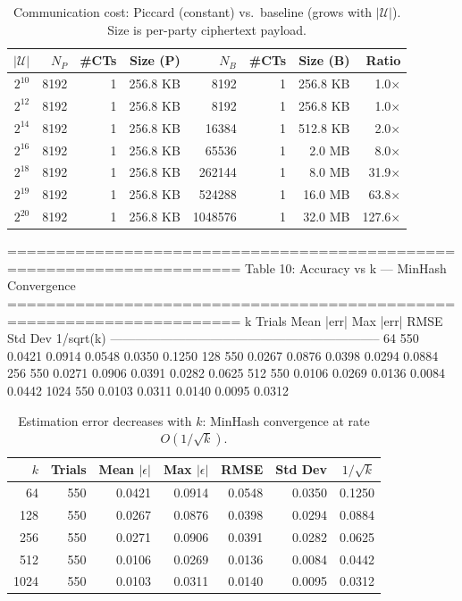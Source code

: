 \begin{table}[t]
\centering
\caption{Communication cost: Piccard (constant) vs.\ baseline (grows with $|\mathcal{U}|$). Size is per-party ciphertext payload.}
\label{tab:communication-cost}
\begin{tabular}{rrrrrrrr}
\toprule
$|\mathcal{U}|$ & $N_P$ & \#CTs & Size (P) & $N_B$ & \#CTs & Size (B) & Ratio \\
\midrule
$2^{10}$ & 8192 & 1 & 256.8 KB & 8192 & 1 & 256.8 KB & 1.0$\times$ \\
$2^{12}$ & 8192 & 1 & 256.8 KB & 8192 & 1 & 256.8 KB & 1.0$\times$ \\
$2^{14}$ & 8192 & 1 & 256.8 KB & 16384 & 1 & 512.8 KB & 2.0$\times$ \\
$2^{16}$ & 8192 & 1 & 256.8 KB & 65536 & 1 & 2.0 MB & 8.0$\times$ \\
$2^{18}$ & 8192 & 1 & 256.8 KB & 262144 & 1 & 8.0 MB & 31.9$\times$ \\
$2^{19}$ & 8192 & 1 & 256.8 KB & 524288 & 1 & 16.0 MB & 63.8$\times$ \\
$2^{20}$ & 8192 & 1 & 256.8 KB & 1048576 & 1 & 32.0 MB & 127.6$\times$ \\
\bottomrule
\end{tabular}
\end{table}


======================================================================
  Table 10: Accuracy vs k — MinHash Convergence
======================================================================
     k  Trials  Mean |err|  Max |err|    RMSE  Std Dev  1/sqrt(k)
-----------------------------------------------------------------
    64     550      0.0421     0.0914  0.0548   0.0350     0.1250
   128     550      0.0267     0.0876  0.0398   0.0294     0.0884
   256     550      0.0271     0.0906  0.0391   0.0282     0.0625
   512     550      0.0106     0.0269  0.0136   0.0084     0.0442
  1024     550      0.0103     0.0311  0.0140   0.0095     0.0312

\begin{table}[t]
\centering
\caption{Estimation error decreases with $k$: MinHash convergence at rate $O(1/\sqrt{k})$.}
\label{tab:accuracy-vs-k}
\begin{tabular}{rrrrrrr}
\toprule
$k$ & Trials & Mean $|\epsilon|$ & Max $|\epsilon|$ & RMSE & Std Dev & $1/\sqrt{k}$ \\
\midrule
64 & 550 & 0.0421 & 0.0914 & 0.0548 & 0.0350 & 0.1250 \\
128 & 550 & 0.0267 & 0.0876 & 0.0398 & 0.0294 & 0.0884 \\
256 & 550 & 0.0271 & 0.0906 & 0.0391 & 0.0282 & 0.0625 \\
512 & 550 & 0.0106 & 0.0269 & 0.0136 & 0.0084 & 0.0442 \\
1024 & 550 & 0.0103 & 0.0311 & 0.0140 & 0.0095 & 0.0312 \\
\bottomrule
\end{tabular}
\end{table}


